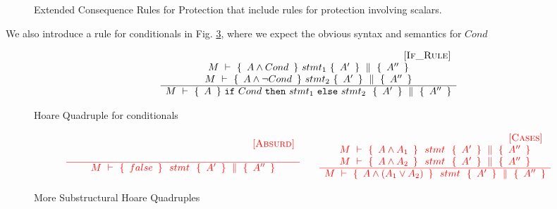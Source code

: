 \begin{figure}[htb]
\caption{Extended Consequence Rules for Protection that include rules for protection involving scalars.}
\label{f:protection:conseq:ext}
\end{figure}

We also introduce a rule for conditionals in Fig. \ref{f:if}, {where we expect the obvious syntax and semantics for $Cond$}

\begin{figure}[htb]
$$
\begin{array}{c} \strut \ \ \ \ \ \ \ \ \ \ \ \ \ \ \ \ \ \ \ \ \ \ \ \ \ \ \ \ \ \ \ \ \ \ \ \ \ \ \ \ \ \ \ \ \ \ \ \ \ \ {{\mbox{\hspace{2.5cm} [\sc{If\_Rule}]}}} \\ 
	 \begin{array}{c}
	  M\ \vdash\ \{\,\  A \wedge Cond \  \, \} \    stmt_1   \  \{\,\ A' \ \, \}\, \,\parallel\,\, \{\, \ A'' \  \, \}
	\\
	    M\ \vdash\ \{\,\  A \wedge \neg Cond \  \, \} \    stmt_2   \  \{\,\ A' \ \, \}\, \,\parallel\,\, \{\, \ A'' \  \, \}	
	\end{array}
	 \\ \hline   	
	M\ \vdash\ \{\,\  A \  \, \} \  \mbox{\normalfont{\texttt{if}}}\ Cond\ \mbox{\normalfont{\texttt{then}}}\ stmt_1\ \mbox{\normalfont{\texttt{else}}}\ stmt_2 \ \  \{\,\ A' \ \, \}\, \,\parallel\,\, \{\, \ A'' \  \, \}
 \end{array}
$$
\caption{Hoare Quadruple  for conditionals}
\label{f:if}
\end{figure}


\begin{figure}[htb]
$$
\begin{array}{lcl}
\color{red} {
 \begin{array}{c} \strut \ \ \ \ \ \ \ \ \ \ \ \ \ \ \ \ \ \ \ \ \ \ \ \ \ \ \ \ \ \ \ \ \ \ \ \ \ \ \ \ \ \ \ \ \ \ \ \ \ \ {{\mbox{\hspace{0.5cm} [\sc{Absurd}]}}} \\ 	
	 \\ \hline   	
	M\ \vdash\ \{\,\  false \  \, \} \  \ stmt \ \  \{\,\ A' \ \, \}\, \,\parallel\,\, \{\, \ A'' \  \, \} 
 \end{array} 
} \color{black} & &
\color{red} {
 \begin{array}{c} \strut \ \ \ \ \ \ \ \ \ \ \ \ \ \ \ \ \ \ \ \ \ \ \ \ \ \ \ \ \ \ \ \ \ \ \ \ \ \ \ \ \ \ \ \ \ \ \ \ \ \ {{\mbox{\hspace{0.5cm} [\sc{Cases}]}}} \\  \begin{array}{l}
	M\ \vdash\ \{\,\  A \wedge A_{1}  \  \, \} \  \ stmt \ \  \{\,\ A' \ \, \}\, \,\parallel\,\, \{\, \ A'' \  \, \} 
		\\
		M\ \vdash\ \{\,\   A \wedge A_{2} \  \, \} \  \ stmt \ \  \{\,\ A' \ \, \}\, \,\parallel\,\, \{\, \ A'' \  \, \} 
	\end{array}	
	 \\ \hline   	
	M\ \vdash\ \{\,\  A \wedge (A_1 \vee A_2) \  \, \} \  \ stmt \ \  \{\,\ A' \ \, \}\, \,\parallel\,\, \{\, \ A'' \  \, \} 
 \end{array} 
} \color{black}
\end{array}
$$
\caption{More Substructural Hoare Quadruples}
\label{f:if}
\end{figure}


